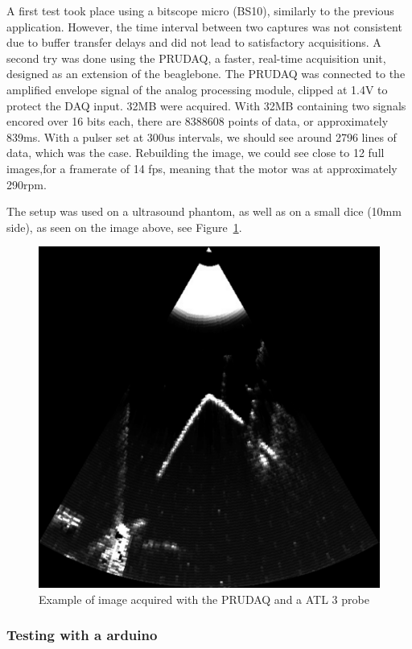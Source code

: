 \documentclass[letterpaper, 10 pt, conference]{ieeeconf} %
\begin{document}
A first test took place using a bitscope micro (BS10), similarly to the previous application. However, the time interval between two captures was not consistent due to buffer transfer delays and did not lead to satisfactory acquisitions. A second try was done using the PRUDAQ, a faster, real-time acquisition unit, designed as an extension of the beaglebone. The PRUDAQ was connected to the amplified envelope signal of the analog processing module, clipped at 1.4V to protect the DAQ input. 32MB were acquired. With 32MB containing two signals encored over 16 bits each, there are 8388608 points of data, or approximately 839ms. With a pulser set at 300us intervals, we should see around 2796 lines of data, which was the case. Rebuilding the image, we could see close to 12 full images,for a framerate of 14 fps, meaning that the motor was at approximately 290rpm.

The setup was used on a ultrasound phantom, as well as on a small dice (10mm side), as seen on the image above, see Figure~\ref{fig:retroATL}.

\begin{figure}%
\centering
\includegraphics[width=.8\linewidth]{sonde3V}
\caption{Example of image acquired with the PRUDAQ and a ATL 3 probe}
\label{fig:retroATL}
\end{figure}

\subsubsection{Testing with a arduino}
\end{document}

